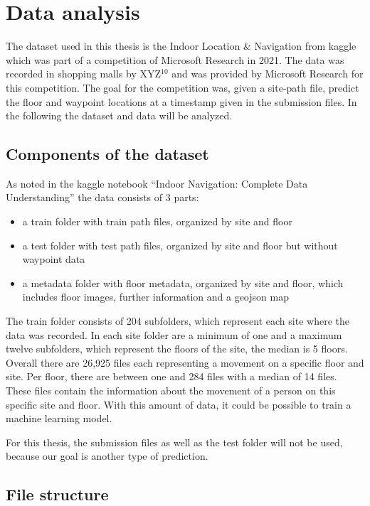 \chapter{Data analysis}\label{sec:data-ana}

The dataset used in this thesis is the Indoor Location \& Navigation from kaggle\cite{kaggle} which was part of a competition of Microsoft Research in 2021\cite{IndoorLocationNavigation}.
The data was recorded in shopping malls by XYZ\(^{10}\) and was provided by Microsoft Research for this competition.
The goal for the competition was, given a site-path file, predict the floor and waypoint locations at a timestamp given in the submission files.
In the following the dataset and data will be analyzed.


\section{Components of the dataset}\label{sec:data}
As noted in the kaggle notebook ``Indoor Navigation: Complete Data Understanding'' \cite{IndoorNavigationUnderstanding} the data consists of 3 parts:
% 
\begin{itemize}
    \item a train folder with train path files, organized by site and floor
    \item a test folder with test path files, organized by site and floor but without waypoint data
    \item a metadata folder with floor metadata, organized by site and floor, which includes floor images, further information and a geojson map
\end{itemize}

The train folder consists of 204 subfolders, which represent each site where the data was recorded.
In each site folder are a minimum of one and a maximum twelve subfolders, which represent the floors of the site, the median is 5 floors.
Overall there are 26,925 files each representing a movement on a specific floor and site.
Per floor, there are between one and 284 files with a median of 14 files.
These files contain the information about the movement of a person on this specific site and floor.
With this amount of data, it could be possible to train a machine learning model.

For this thesis, the submission files as well as the test folder will not be used, because our goal is another type of prediction.


\section{File structure}\label{sec:file-structure}

